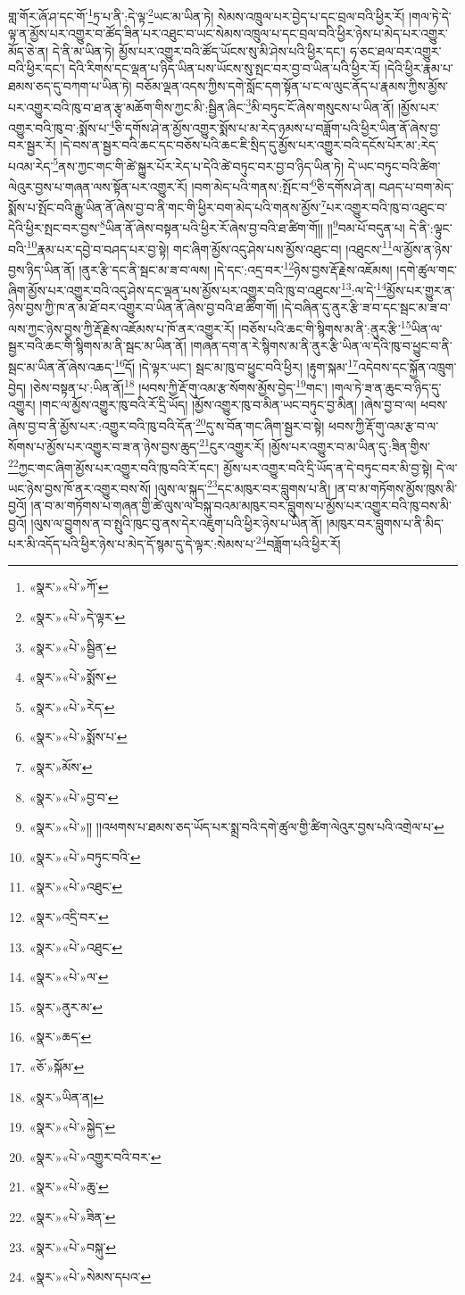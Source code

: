 གླ་གོར་ཞོ་ཤ་དང་གོ་\footnote{«སྣར་»«པེ་»ཀོ་}ཏྲ་པ་ནི་:དེ་ལྟ་\footnote{«སྣར་»«པེ་»དེ་ལྟར་}ཡང་མ་ཡིན་ཏེ། སེམས་འཁྲུལ་པར་བྱེད་པ་དང་བྲལ་བའི་ཕྱིར་རོ། །གལ་ཏེ་དེ་ལྟ་ན་མྱོས་པར་འགྱུར་བ་ཚོད་ཟིན་པར་འཐུང་བ་ཡང་སེམས་འཁྲུལ་པ་དང་བྲལ་བའི་ཕྱིར་ཉེས་པ་མེད་པར་འགྱུར་མོད་ཅེ་ན། དེ་ནི་མ་ཡིན་ཏེ། མྱོས་པར་འགྱུར་བའི་ཚོད་ཡོངས་སུ་མི་ཤེས་པའི་ཕྱིར་དང་། ཧ་ཅང་ཐལ་བར་འགྱུར་བའི་ཕྱིར་དང་། དེའི་རིགས་དང་ལྡན་པ་ཉིད་ཡིན་པས་ཡོངས་སུ་སྤང་བར་བྱ་བ་ཡིན་པའི་ཕྱིར་རོ། །དེའི་ཕྱིར་རྣམ་པ་ཐམས་ཅད་དུ་བཀག་པ་ཡིན་ཏེ། བཅོམ་ལྡན་འདས་ཀྱིས་དགེ་སློང་དག་སྟོན་པ་ང་ལ་ལུང་ནོད་པ་རྣམས་ཀྱིས་མྱོས་པར་འགྱུར་བའི་ཁུ་བ་ཐ་ན་རྩྭ་མཆོག་གིས་ཀྱང་མི་:སྦྱིན་ཞིང་\footnote{«སྣར་»«པེ་»སྦྱིན་}མི་བཏུང་ངོ་ཞེས་གསུངས་པ་ཡིན་ནོ། །མྱོས་པར་འགྱུར་བའི་ཁུ་བ་:སྨོས་པ་\footnote{«སྣར་»«པེ་»སྨོས་}ཅི་དགོས་ཤེ་ན་མྱོས་འགྱུར་སྨོས་པ་མ་རེད་ཉམས་པ་བཟློག་པའི་ཕྱིར་ཡིན་ནོ་ཞེས་བྱ་བར་སྦྱར་རོ། །དེ་བས་ན་སྦྱར་བའི་ཆང་དང་བཅོས་པའི་ཆང་ཇི་སྲིད་དུ་མྱོས་པར་འགྱུར་བའི་དངོས་པོར་མ་:རེད་པའམ་རེད་\footnote{«སྣར་»«པེ་»རེད་}ནས་ཀྱང་གང་གི་ཚེ་སྐྱུར་པོར་རེད་པ་དེའི་ཚེ་བཏུང་བར་བྱ་བ་ཉིད་ཡིན་ཏེ། དེ་ཡང་བཏུང་བའི་ཚིག་ལེའུར་བྱས་པ་གཞན་ལས་སྟོན་པར་འགྱུར་རོ། །བག་མེད་པའི་གནས་:སྤོང་བ་\footnote{«སྣར་»«པེ་»སྨོས་པ་}ཅི་དགོས་ཤེ་ན། བཤད་པ་བག་མེད་སྨོས་པ་སྤོང་བའི་རྒྱུ་ཡིན་ནོ་ཞེས་བྱ་བ་ནི་གང་གི་ཕྱིར་བག་མེད་པའི་གནས་མྱོས་\footnote{«སྣར་»མོས་}པར་འགྱུར་བའི་ཁུ་བ་འཐུང་བ་དེའི་ཕྱིར་སྤང་བར་བྱས་\footnote{«སྣར་»«པེ་»བྱ་བ་}ཡིན་ནོ་ཞེས་བསྟན་པའི་ཕྱིར་རོ་ཞེས་བྱ་བའི་ཐ་ཚིག་གོ།། །།\footnote{«སྣར་»«པེ་»།། །།འཕགས་པ་ཐམས་ཅད་ཡོད་པར་སྨྲ་བའི་དགེ་ཚུལ་གྱི་ཚིག་ལེའུར་བྱས་པའི་འགྲེལ་པ་}བམ་པོ་བདུན་པ། དེ་ནི་:ལྟུང་བའི་\footnote{«སྣར་»«པེ་»བཏུང་བའི་}རྣམ་པར་དབྱེ་བ་བཤད་པར་བྱ་སྟེ། གང་ཞིག་མྱོས་འདུ་ཤེས་པས་མྱོས་འཐུང་བ། །འཐུངས་\footnote{«སྣར་»«པེ་»འཐུང་}ལ་མྱོས་ན་ཉེས་བྱས་ཉིད་ཡིན་ནོ། །ནུར་རྩི་དང་ནི་སྦང་མ་ཟ་བ་ལས། །དེ་དང་:འདྲ་བར་\footnote{«སྣར་»འདྲི་བར་}ཉེས་བྱས་རྡོ་རྗེས་འཇོམས། །དགེ་ཚུལ་གང་ཞིག་མྱོས་པར་འགྱུར་བའི་འདུ་ཤེས་དང་ལྡན་པས་མྱོས་པར་འགྱུར་བའི་ཁུ་བ་འཐུངས་\footnote{«སྣར་»«པེ་»འཐུང་}:ལ་དེ་\footnote{«སྣར་»«པེ་»ལ་}མྱོས་པར་གྱུར་ན་ཉེས་བྱས་ཀྱི་ཁ་ན་མ་ཐོ་བར་འགྱུར་བ་ཡིན་ནོ་ཞེས་བྱ་བའི་ཐ་ཚིག་གོ། །དེ་བཞིན་དུ་ནུར་རྩི་ཟ་བ་དང་སྦང་མ་ཟ་བ་ལས་ཀྱང་ཉེས་བྱས་ཀྱི་རྡོ་རྗེས་འཇོམས་པ་ཁོ་ནར་འགྱུར་རོ། །བཅོས་པའི་ཆང་གི་སྙིགས་མ་ནི་:ནུར་རྩི་\footnote{«སྣར་»ནུར་མ་}ཡིན་ལ་སྦྱར་བའི་ཆང་གི་སྙིགས་མ་ནི་སྦང་མ་ཡིན་ནོ། །གཞན་དག་ན་རེ་སྙིགས་མ་ནི་ནུར་རྩི་ཡིན་ལ་དེའི་ཁུ་བ་ཕྱུང་བ་ནི་སྦང་མ་ཡིན་ནོ་ཞེས་འཆད་\footnote{«སྣར་»ཆད་}དོ། །དེ་ལྟར་ཡང་། སྦང་མ་ཁུ་བ་ཕྱུང་བའི་ཕྱིར། །རྟུག་སྐམ་\footnote{«ཅོ་»སྐོམ་}འདེབས་དང་སྐྱོན་འཁྲུག་བྱེད། །ཅེས་བསྟན་པ་:ཡིན་ནོ།\footnote{«སྣར་»ཡིན་ན།} །ཕབས་ཀྱི་རྡོ་གུ་འམ་རྩ་སོགས་མྱོས་བྱེད་\footnote{«སྣར་»«པེ་»སྐྱེད་}གང་། །གལ་ཏེ་ཟ་ན་ཆུང་བ་ཉིད་དུ་འགྱུར། །གང་ལ་མྱོས་འགྱུར་ཁུ་བའི་རོ་དྲི་ཡོད། །མྱོས་འགྱུར་ཁུ་བ་མིན་ཡང་བཏུང་བྱ་མིན། །ཞེས་བྱ་བ་ལ། ཕབས་ཞེས་བྱ་བ་ནི་མྱོས་པར་:འགྱུར་བའི་ཁུ་བའི་དོན་\footnote{«སྣར་»«པེ་»འགྱུར་བའི་བར་}དུ་ས་བོན་གང་ཞིག་སྦྱར་བ་སྟེ། ཕབས་ཀྱི་རྡོ་གུ་འམ་རྩ་བ་ལ་སོགས་པ་མྱོས་པར་འགྱུར་བ་ཟ་ན་ཉེས་བྱས་ཆུད་\footnote{«སྣར་»«པེ་»ཆུ་}ངུར་འགྱུར་རོ། །མྱོས་པར་འགྱུར་བ་མ་ཡིན་དུ་:ཟིན་གྱིས་\footnote{«སྣར་»«པེ་»ཟིན་}ཀྱང་གང་ཞིག་མྱོས་པར་འགྱུར་བའི་ཁུ་བའི་རོ་དང་། མྱོས་པར་འགྱུར་བའི་དྲི་ཡོད་ན་དེ་བཏུང་བར་མི་བྱ་སྟེ། དེ་ལ་ཡང་ཉེས་བྱས་ཁོ་ནར་འགྱུར་བས་སོ། །ལུས་ལ་སྐུད་\footnote{«སྣར་»«པེ་»བསྐུ་}དང་མཁུར་བར་བླུགས་པ་ནི། །ན་བ་མ་གཏོགས་མྱོས་ཁུས་མི་བྱའོ། །ན་བ་མ་གཏོགས་པ་གཞན་གྱི་ཚེ་ལུས་ལ་བསྐུ་བའམ་མཁུར་བར་བླུགས་པ་མྱོས་པར་འགྱུར་བའི་ཁུ་བས་མི་བྱའོ། །ལུས་ལ་བྱུགས་ན་བ་སྤུའི་ཁུང་བུ་ནས་དེར་འཇུག་པའི་ཕྱིར་ཉེས་པ་ཡིན་ནོ། །མཁུར་བར་བླུགས་པ་ནི་མིད་པར་མི་འདོད་པའི་ཕྱིར་ཉེས་པ་མེད་དོ་སྙམ་དུ་དེ་ལྟར་:སེམས་པ་\footnote{«སྣར་»«པེ་»སེམས་དཔའ་}བཟློག་པའི་ཕྱིར་རོ། 